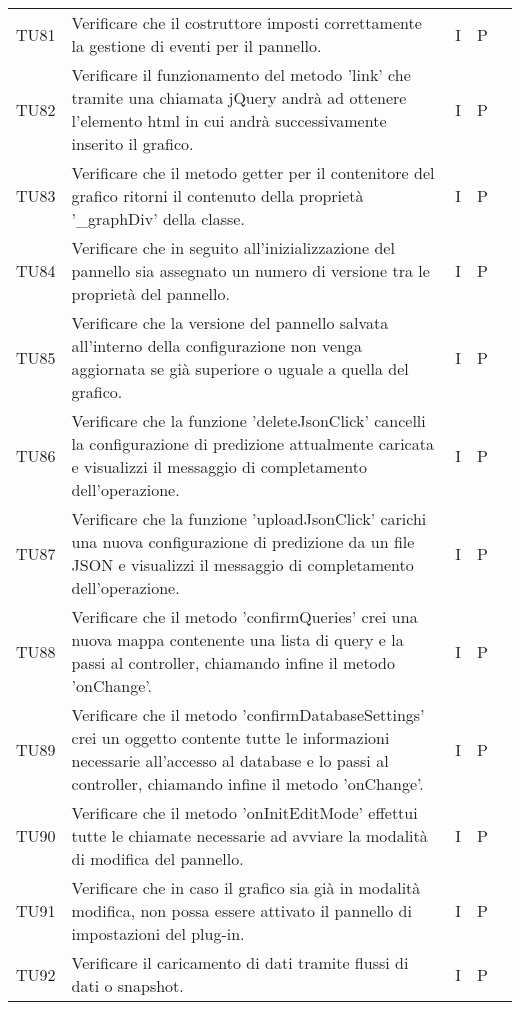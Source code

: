 \begin{longtable} {
		>{}p{15mm} 
		>{}p{79.5mm}
		>{}p{15mm} 
		>{}p{15mm}
		>{}p{0mm}}
	TU81		& Verificare che il costruttore imposti correttamente la gestione di eventi per il pannello.& I & P &\TBstrut \\ [2mm]
	TU82		& Verificare il funzionamento del metodo 'link' che tramite una chiamata jQuery andrà ad ottenere l'elemento html in cui andrà successivamente inserito il grafico.& I & P &\TBstrut \\ [2mm]
	TU83		& Verificare che il metodo getter per il contenitore del grafico ritorni il contenuto della proprietà '_graphDiv' della classe.& I & P &\TBstrut \\ [2mm]
	TU84		& Verificare che in seguito all'inizializzazione del pannello sia assegnato un numero di versione tra le proprietà del pannello.& I & P &\TBstrut \\ [2mm]
	TU85		& Verificare che la versione del pannello salvata all'interno della configurazione non venga aggiornata se già superiore o uguale a quella del grafico.& I & P &\TBstrut \\ [2mm]
	TU86		& Verificare che la funzione 'deleteJsonClick' cancelli la configurazione di predizione attualmente caricata e visualizzi il messaggio di completamento dell'operazione.& I & P &\TBstrut \\ [2mm]
	TU87		& Verificare che la funzione 'uploadJsonClick' carichi una nuova configurazione di predizione da un file JSON e visualizzi il messaggio di completamento dell'operazione.& I & P &\TBstrut \\ [2mm]
	TU88		& Verificare che il metodo 'confirmQueries' crei una nuova mappa contenente una lista di query e la passi al controller, chiamando infine il metodo 'onChange'.& I & P &\TBstrut \\ [2mm]
	TU89		& Verificare che il metodo 'confirmDatabaseSettings' crei un oggetto contente tutte le informazioni necessarie all'accesso al database e lo passi al controller, chiamando infine il metodo 'onChange'.& I & P &\TBstrut \\ [2mm]
	TU90		& Verificare che il metodo 'onInitEditMode' effettui tutte le chiamate necessarie ad avviare la modalità di modifica del pannello.& I & P &\TBstrut \\ [2mm]
	TU91		& Verificare che in caso il grafico sia già in modalità modifica, non possa essere attivato il pannello di impostazioni del plug-in.& I & P &\TBstrut \\ [2mm]
	TU92		& Verificare il caricamento di dati tramite flussi di dati o snapshot.& I & P &\TBstrut \\ [2mm]

\end{longtable}
